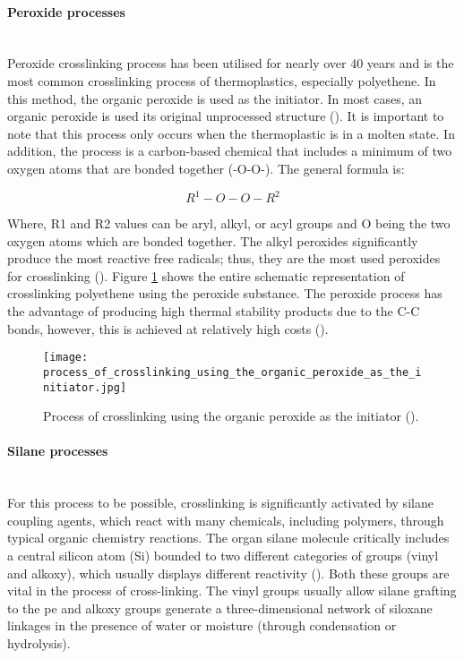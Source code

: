\paragraph{Peroxide processes} \hfill \\
Peroxide crosslinking process has been utilised for nearly over 40 years and is the most common crosslinking process of thermoplastics, especially polyethene. In this method, the organic peroxide is used as the initiator. In most cases, an organic peroxide is used its original unprocessed structure (\cite{peacock2000handbook}). It is important to note that this process only occurs when the thermoplastic is in a molten state. In addition, the process is a carbon-based chemical that includes a minimum of two oxygen atoms that are bonded together (-O-O-). The general formula is:

 \begin{equation}
    R^1-O-O-R^2
 \end{equation}

Where, R1 and R2 values can be aryl, alkyl, or acyl groups and O being the two oxygen atoms which are bonded together. The alkyl peroxides significantly produce the most reactive free radicals; thus, they are the most used peroxides for crosslinking (\cite{kurtz2009cross}). Figure \ref{ch3:figure:crosslinking_process} shows the entire schematic representation of crosslinking polyethene using the peroxide substance. The peroxide process has the advantage of producing high thermal stability products due to the C-C bonds, however, this is achieved at relatively high costs (\cite{patterson2022cross}).

\begin{figure}[H]
    \centering
    \texttt{[image: process\_of\_crosslinking\_using\_the\_organic\_peroxide\_as\_the\_initiator.jpg]}
    \caption{Process of crosslinking using the organic peroxide as the initiator (\cite{peacock2000handbook}). }
    \label{ch3:figure:crosslinking_process}
\end{figure}

\paragraph{Silane processes} \hfill \\
For this process to be possible, crosslinking is significantly activated by silane coupling agents, which react with many chemicals, including polymers, through typical organic chemistry reactions. The organ silane molecule critically includes a central silicon atom (Si) bounded to two different categories of groups (vinyl and alkoxy), which usually displays different reactivity (\cite{kurtz2009cross}). Both these groups are vital in the process of cross-linking. The vinyl groups usually allow silane grafting to the \acrshort{pe} and alkoxy groups generate a three-dimensional network of siloxane linkages in the presence of water or moisture (through condensation or hydrolysis).

